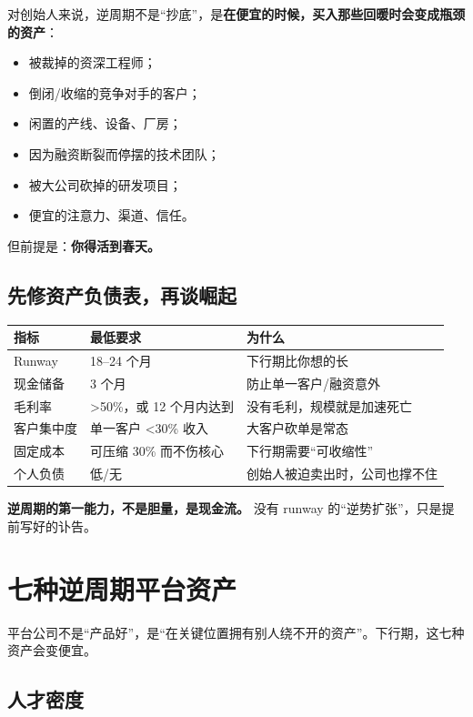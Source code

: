 对创始人来说，逆周期不是``抄底''，是\textbf{在便宜的时候，买入那些回暖时会变成瓶颈的资产}：

\begin{itemize}
\tightlist
\item
  被裁掉的资深工程师；
\item
  倒闭/收缩的竞争对手的客户；
\item
  闲置的产线、设备、厂房；
\item
  因为融资断裂而停摆的技术团队；
\item
  被大公司砍掉的研发项目；
\item
  便宜的注意力、渠道、信任。
\end{itemize}

但前提是：\textbf{你得活到春天。}

\section{先修资产负债表，再谈崛起}\label{ux5148ux4feeux8d44ux4ea7ux8d1fux503aux8868ux518dux8c08ux5d1bux8d77}

\begin{longtable}[]{@{}lll@{}}
\toprule\noalign{}
指标 & 最低要求 & 为什么 \\
\midrule\noalign{}
\endhead
\bottomrule\noalign{}
\endlastfoot
Runway & 18--24 个月 & 下行期比你想的长 \\
现金储备 & 3 个月 & 防止单一客户/融资意外 \\
毛利率 & \textgreater50\%，或 12 个月内达到 &
没有毛利，规模就是加速死亡 \\
客户集中度 & 单一客户 \textless30\% 收入 & 大客户砍单是常态 \\
固定成本 & 可压缩 30\% 而不伤核心 & 下行期需要``可收缩性'' \\
个人负债 & 低/无 & 创始人被迫卖出时，公司也撑不住 \\
\end{longtable}

\textbf{逆周期的第一能力，不是胆量，是现金流。} 没有 runway
的``逆势扩张''，只是提前写好的讣告。

\chapter{七种逆周期平台资产}\label{ux4e03ux79cdux9006ux5468ux671fux5e73ux53f0ux8d44ux4ea7}

平台公司不是``产品好''，是``在关键位置拥有别人绕不开的资产''。下行期，这七种资产会变便宜。

\section{人才密度}\label{ux4ebaux624dux5bc6ux5ea6}

